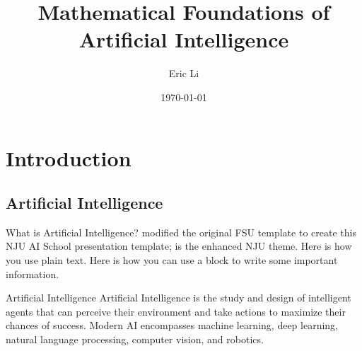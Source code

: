 \documentclass{ctexbeamer}
\title[AI Foundations]{Mathematical Foundations of Artificial Intelligence}
\author[Li]{Eric Li}
\institute{School of Artificial Intelligence, Nanjing University}
\date{\today}
\begin{document}
\maketitle

\section{Introduction}
\subsection{Artificial Intelligence}
\begin{frame}{What is Artificial Intelligence?}
    \citet{fsumathposter25} modified the original FSU template to create this NJU AI School presentation template; \citep{njubeamerpresent25} is the enhanced NJU theme. Here is how you use plain text. Here is how you can use a block to write some important information.
    \begin{block}{Artificial Intelligence}
        Artificial Intelligence is the study and design of intelligent agents that can perceive their environment and take actions to maximize their chances of success. Modern AI encompasses machine learning, deep learning, natural language processing, computer vision, and robotics.
    \end{block}
\end{frame}
\end{document}

